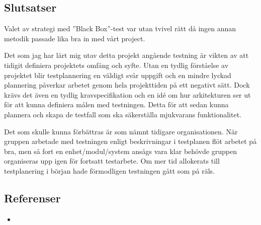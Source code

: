 	\subsection{Slutsatser}
	Valet av strategi med ''Black Box''-test var utan tvivel rätt då ingen annan metodik passade lika bra in med vårt project. 
	
	Det som jag har lärt mig utav detta projekt angående testning är vikten av att tidigit definiera projektets omfång och syfte. Utan en tydlig förståelse av projektet blir testplannering en väldigt svår uppgift och en mindre lyckad plannering påverkar arbetet genom hela projekttiden på ett negativt sätt. Dock krävs det även en tydlig kravspecifikation och en idé om hur arkitekturen ser ut för att kunna definiera målen med testningen. Detta för att sedan kunna plannera och skapa de testfall som ska säkerställa mjukvarans funktionalitet.
	
	Det som skulle kunna förbättras är som nämnt tidigare organisationen. När gruppen arbetade med testningen enligt beskrivningar i testplanen flöt arbetet på bra, men så fort en enhet/modul/system ansågs vara klar behövde gruppen organiseras upp igen för fortsatt testarbete. Om mer tid allokerats till testplanering i början hade förmodligen testningen gått som på räls.
	
	\subsection{Referenser}
	\begin{itemize}
	\item{}
	\end{itemize}
	
	
